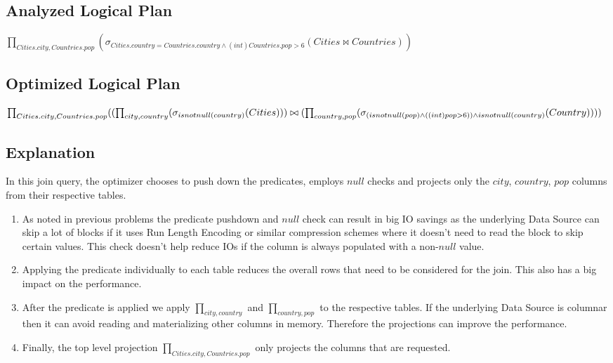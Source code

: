 \documentclass[12pt]{article}
\begin{document}
\subsection*{Analyzed Logical Plan}

$\prod_{Cities.city, Countries.pop}(\sigma_{Cities.country = Countries.country \wedge (int) Countries.pop > 6}(Cities \bowtie Countries))$

\subsection*{Optimized Logical Plan}

$\prod_{Cities.city, Countries.pop}((\prod_{city, country}(\sigma_{isnotnull(country)}(Cities))) \bowtie \\
 (\prod_{country, pop}(\sigma_{(isnotnull(pop) \wedge ((int) pop > 6)) \wedge isnotnull(country)}(Country))))$


\subsection*{Explanation}

In this join query, the optimizer chooses to push down the predicates, employs $null$ checks and projects only the $city$, $country$, $pop$ columns from their respective tables.

\begin{enumerate}

\item As noted in previous problems the predicate pushdown and $null$ check can result in big IO savings as the underlying Data Source can skip a lot of blocks if it uses Run Length Encoding or similar compression schemes where it doesn't need to read the block to skip certain values. This check doesn't help reduce IOs if the column is always populated with a non-$null$ value.

\item Applying the predicate individually to each table reduces the overall rows that need to be considered for the join. This also has a big impact on the performance.

\item After the predicate is applied we apply $\prod_{city, country}$ and $\prod_{country, pop}$ to the respective tables. If the underlying Data Source is columnar then it can avoid reading and materializing other columns in memory. Therefore the projections can improve the performance.

\item Finally, the top level projection $\prod_{Cities.city, Countries.pop}$ only projects the columns that are requested.

\end{enumerate}
\end{document}
